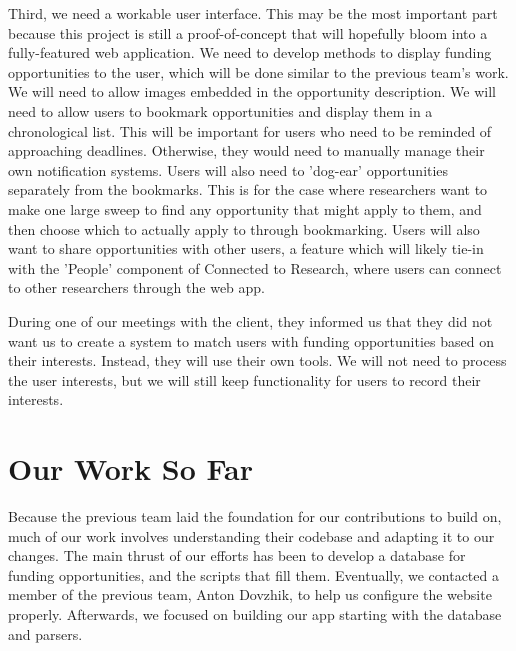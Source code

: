 \documentclass[onecolumn]{IEEEtran}
\begin{document}
Third, we need a workable user interface. This may be the most important part because this project is still a proof-of-concept that will hopefully bloom into a fully-featured web application. We need to develop methods to display funding opportunities to the user, which will be done similar to the previous team's work. We will need to allow images embedded in the opportunity description. We will need to allow users to bookmark opportunities and display them in a chronological list. This will be important for users who need to be reminded of approaching deadlines. Otherwise, they would need to manually manage their own notification systems. Users will also need to 'dog-ear' opportunities separately from the bookmarks. This is for the case where researchers want to make one large sweep to find any opportunity that might apply to them, and then choose which to actually apply to through bookmarking. Users will also want to share opportunities with other users, a feature which will likely tie-in with the 'People' component of Connected to Research, where users can connect to other researchers through the web app. 

During one of our meetings with the client, they informed us that they did not want us to create a system to match users with funding opportunities based on their interests. Instead, they will use their own tools. We will not need to process the user interests, but we will still keep functionality for users to record their interests.

\section{Our Work So Far}
Because the previous team laid the foundation for our contributions to build on, much of our work involves understanding their codebase and adapting it to our changes. The main thrust of our efforts has been to develop a database for funding opportunities, and the scripts that fill them. Eventually, we contacted a member of the previous team, Anton Dovzhik, to help us configure the website properly. Afterwards, we focused on building our app starting with the database and parsers.
\end{document}
